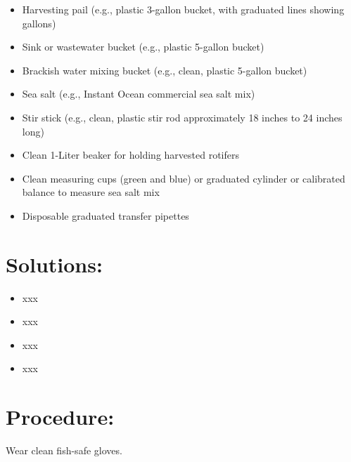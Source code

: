 \documentclass[
  letterpaper,
  DIV=11,
  numbers=noendperiod]{scrreprt}
\providecommand{\tightlist}{%
  \setlength{\itemsep}{0pt}\setlength{\parskip}{0pt}}\usepackage{longtable,booktabs,array}
\begin{document}
\begin{itemize}
\begin{tcolorbox}
  \end{tcolorbox}
\item
  Harvesting pail (e.g., plastic 3-gallon bucket, with graduated lines
  showing gallons)
\item
  Sink or wastewater bucket (e.g., plastic 5-gallon bucket)
\item
  Brackish water mixing bucket (e.g., clean, plastic 5-gallon bucket)
\item
  Sea salt (e.g., Instant Ocean commercial sea salt mix)
\item
  Stir stick (e.g., clean, plastic stir rod approximately 18 inches to
  24 inches long)
\item
  Clean 1-Liter beaker for holding harvested rotifers
\item
  Clean measuring cups (green and blue) or graduated cylinder or
  calibrated balance to measure sea salt mix
\item
  Disposable graduated transfer pipettes
\end{itemize}

\hypertarget{solutions-35}{%
\section{Solutions:}\label{solutions-35}}

\begin{itemize}
\tightlist
\item
  xxx
\item
  xxx
\item
  xxx
\item
  xxx
\end{itemize}

\hypertarget{procedure-45}{%
\section{Procedure:}\label{procedure-45}}

\begin{tcolorbox}[enhanced jigsaw, rightrule=.15mm, title=\textcolor{quarto-callout-warning-color}{\faExclamationTriangle}\hspace{0.5em}{NOTES}, titlerule=0mm, opacitybacktitle=0.6, toprule=.15mm, bottomrule=.15mm, opacityback=0, left=2mm, colframe=quarto-callout-warning-color-frame, breakable, coltitle=black, colback=white, colbacktitle=quarto-callout-warning-color!10!white, bottomtitle=1mm, leftrule=.75mm, toptitle=1mm, arc=.35mm]

Wear clean fish-safe gloves.

\end{tcolorbox}
\end{document}
